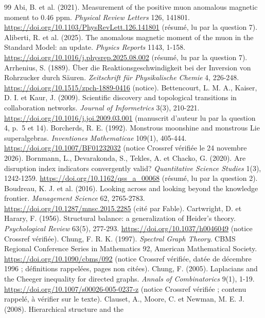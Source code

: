 \documentclass[11pt,a4paper]{article}
\theoremstyle{definition}
\theoremstyle{plain}
\begin{document}
\begin{thebibliography}{99}
 Abi, B. et al. (2021). Measurement of the positive muon anomalous magnetic moment
to 0.46 ppm. \emph{Physical Review Letters} 126, 141801. \url{https://doi.org/10.1103/PhysRevLett.126.141801}
(résumé, lu par la question 7).
 Aliberti, R. et al. (2025). The anomalous magnetic moment of the muon in the
Standard Model: an update. \emph{Physics Reports} 1143, 1-158.
\url{https://doi.org/10.1016/j.physrep.2025.08.002} (résumé, lu par la question 7).
 Arrhenius, S. (1889). Über die Reaktionsgeschwindigkeit bei der Inversion von
Rohrzucker durch Säuren. \emph{Zeitschrift für Physikalische Chemie} 4, 226-248.
\url{https://doi.org/10.1515/zpch-1889-0416} (notice).
 Bettencourt, L. M. A., Kaiser, D. I. et Kaur, J. (2009). Scientific discovery
and topological transitions in collaboration networks. \emph{Journal of Informetrics} 3(3), 210-221.
\url{https://doi.org/10.1016/j.joi.2009.03.001} (manuscrit d'auteur lu par la question 4, p.~5 et 14).
 Borcherds, R. E. (1992). Monstrous moonshine and monstrous Lie superalgebras.
\emph{Inventiones Mathematicae} 109(1), 405-444. \url{https://doi.org/10.1007/BF01232032} (notice
Crossref vérifiée le 24 novembre 2026).
 Bornmann, L., Devarakonda, S., Tekles, A. et Chacko, G. (2020). Are disruption
index indicators convergently valid? \emph{Quantitative Science Studies} 1(3), 1242-1259.
\url{https://doi.org/10.1162/qss_a_00068} (résumé, lu par la question 2).
 Boudreau, K. J. et al. (2016). Looking across and looking beyond the knowledge
frontier. \emph{Management Science} 62, 2765-2783. \url{https://doi.org/10.1287/mnsc.2015.2285}
(cité par Fable).
 Cartwright, D. et Harary, F. (1956). Structural balance: a generalization of
Heider's theory. \emph{Psychological Review} 63(5), 277-293. \url{https://doi.org/10.1037/h0046049}
(notice Crossref vérifiée).
 Chung, F. R. K. (1997). \emph{Spectral Graph Theory}. CBMS Regional Conference
Series in Mathematics 92, American Mathematical Society. \url{https://doi.org/10.1090/cbms/092}
(notice Crossref vérifiée, datée de décembre 1996 ; définitions rappelées, pages non citées).
 Chung, F. (2005). Laplacians and the Cheeger inequality for directed graphs.
\emph{Annals of Combinatorics} 9(1), 1-19. \url{https://doi.org/10.1007/s00026-005-0237-z} (notice
Crossref vérifiée ; contenu rappelé, à vérifier sur le texte).
 Clauset, A., Moore, C. et Newman, M. E. J. (2008). Hierarchical structure and the

\end{thebibliography}
\end{document}

